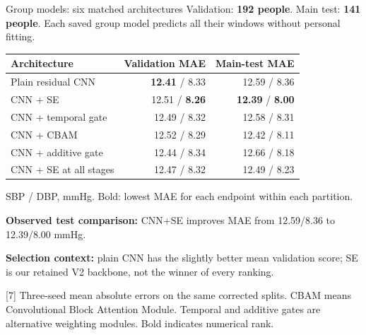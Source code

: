 \documentclass[aspectratio=169,11pt]{beamer}
\newcommand{\stagecontext}{Data and terminology}
\newcommand{\stage}[1]{\gdef\stagecontext{#1}}
\newcommand{\source}[1]{\vfill\par{\fontsize{7}{8}\selectfont\color{Muted}#1}}
\newcommand{\smalltable}{\fontsize{9}{11}\selectfont\renewcommand{\arraystretch}{1.18}}
\begin{document}
\stage{Group model results: no personal calibration}
\begin{frame}{Group models: six matched architectures}
\small Validation: \textbf{192 people}. Main test: \textbf{141 people}. Each saved group model predicts all their windows without personal fitting.
\par\smallskip
\smalltable\begin{tabular}{lrr}\toprule
Architecture & Validation MAE & Main-test MAE\\\midrule
Plain residual CNN & \textbf{12.41} / 8.33 & 12.59 / 8.36\\
CNN + SE & 12.51 / \textbf{8.26} & \textbf{12.39} / \textbf{8.00}\\
CNN + temporal gate & 12.49 / 8.32 & 12.58 / 8.31\\
CNN + CBAM & 12.52 / 8.29 & 12.42 / 8.11\\
CNN + additive gate & 12.44 / 8.34 & 12.66 / 8.18\\
CNN + SE at all stages & 12.47 / 8.32 & 12.49 / 8.23\\
\bottomrule\end{tabular}
\par\smallskip\scriptsize SBP / DBP, mmHg. Bold: lowest MAE for each endpoint within each partition.
\par\smallskip\small\textbf{Observed test comparison:} CNN+SE improves MAE from 12.59/8.36 to 12.39/8.00 mmHg.
\par\smallskip\textbf{Selection context:} plain CNN has the slightly better mean validation score; SE is our retained V2 backbone, not the winner of every ranking.
\source{[7] Three-seed mean absolute errors on the same corrected splits. CBAM means Convolutional Block Attention Module. Temporal and additive gates are alternative weighting modules. Bold indicates numerical rank.}
\end{frame}
\end{document}
